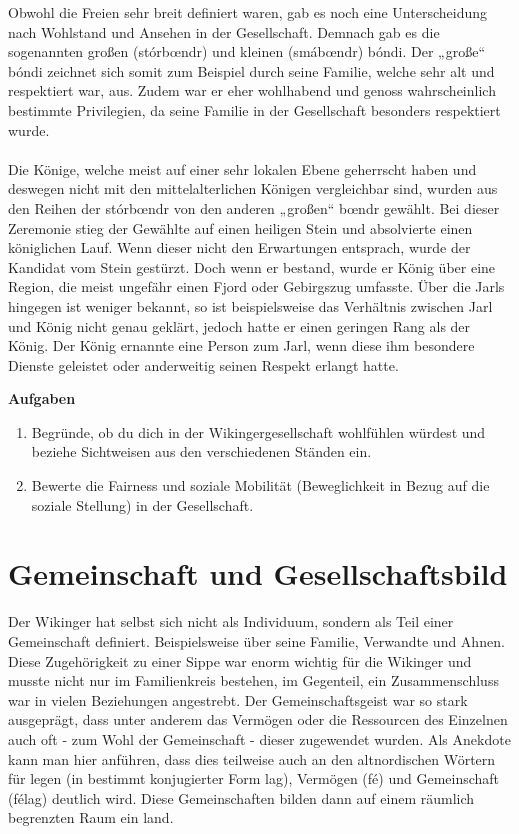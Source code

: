 \documentclass[12pt,a4paper,ngerman,openany]{book}
\newcommand{\aufgaben}[1]{
  \begin{tcolorbox}
    \textbf{Aufgaben}
    \begin{enumerate}
      #1
    \end{enumerate}
  \end{tcolorbox}
} %
\begin{document}
Obwohl die Freien sehr breit definiert waren, gab es noch eine Unterscheidung nach Wohlstand und Ansehen in der Gesellschaft. Demnach gab es die sogenannten großen (stórbœndr) und kleinen (smábœndr) bóndi. 
Der „große“ bóndi zeichnet sich somit zum Beispiel durch seine Familie, welche sehr alt und respektiert war, aus. Zudem war er eher wohlhabend und genoss wahrscheinlich bestimmte Privilegien, da seine Familie in der Gesellschaft besonders respektiert wurde.\\\\
Die Könige, welche meist auf einer sehr lokalen Ebene geherrscht haben und deswegen nicht mit den mittelalterlichen Königen vergleichbar sind, wurden aus den Reihen der stórbœndr von den anderen „großen“ bœndr gewählt. Bei dieser Zeremonie stieg der Gewählte auf einen heiligen Stein und absolvierte einen königlichen Lauf. Wenn dieser nicht den Erwartungen entsprach, wurde der Kandidat vom Stein gestürzt. Doch wenn er bestand, wurde er König über eine Region, die meist ungefähr einen Fjord oder Gebirgszug umfasste.
Über die Jarls hingegen ist weniger bekannt, so ist beispielsweise das Verhältnis zwischen Jarl und König nicht genau geklärt, jedoch hatte er einen geringen Rang als der König. Der König ernannte eine Person zum Jarl, wenn diese ihm besondere Dienste geleistet oder anderweitig seinen Respekt erlangt hatte.

\aufgaben{
  \item Begründe, ob du dich in der Wikingergesellschaft wohlfühlen würdest und beziehe Sichtweisen aus den verschiedenen Ständen ein.
  \item Bewerte die Fairness und soziale Mobilität (Beweglichkeit in Bezug auf die soziale Stellung) in der Gesellschaft.
}


\section{Gemeinschaft und Gesellschaftsbild}
Der Wikinger hat selbst sich nicht als Individuum, sondern als Teil einer Gemeinschaft definiert. Beispielsweise über seine Familie, Verwandte und Ahnen. Diese Zugehörigkeit zu einer Sippe war enorm wichtig für die Wikinger und musste nicht nur im Familienkreis bestehen, im Gegenteil, ein Zusammenschluss war in vielen Beziehungen angestrebt. Der Gemeinschaftsgeist war so stark ausgeprägt, dass unter anderem das Vermögen oder die Ressourcen des Einzelnen auch oft - zum Wohl der Gemeinschaft - dieser zugewendet wurden. Als Anekdote kann man hier anführen, dass dies teilweise auch an den altnordischen Wörtern für legen (in bestimmt konjugierter Form lag), Vermögen (fé) und Gemeinschaft (félag) deutlich wird. Diese Gemeinschaften bilden dann auf einem räumlich begrenzten Raum ein land.
\end{document}
